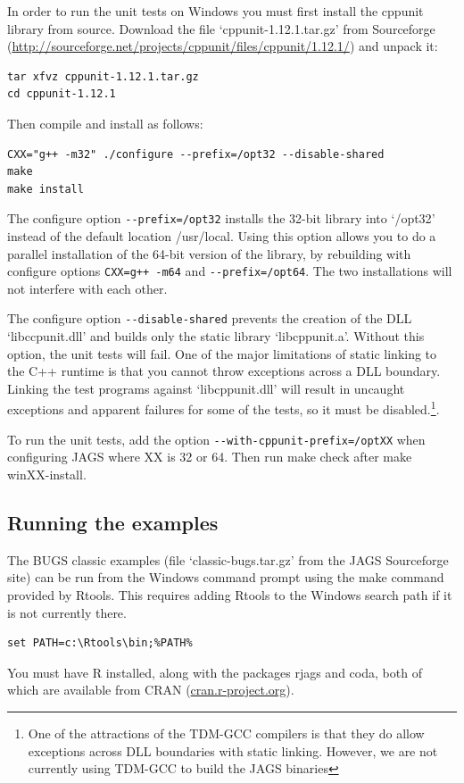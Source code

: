 \documentclass[11pt, a4paper, titlepage]{article}
\newcommand{\code}[1]{{\bgroup{\normalfont\ttfamily #1}\egroup}}
\newcommand{\file}[1]{{`\normalfont\textsf{#1}'}}
\let\command=\code
\begin{document}
In order to run the unit tests on Windows you must first install the
cppunit library from source. Download the file \file{cppunit-1.12.1.tar.gz}
from Sourceforge (\url{http://sourceforge.net/projects/cppunit/files/cppunit/1.12.1/}) and
unpack it:
\begin{verbatim}
tar xfvz cppunit-1.12.1.tar.gz
cd cppunit-1.12.1
\end{verbatim}
Then compile and install as follows:
\begin{verbatim}
CXX="g++ -m32" ./configure --prefix=/opt32 --disable-shared
make
make install
\end{verbatim}
The configure option \verb+--prefix=/opt32+ installs the 32-bit
library into \file{/opt32} instead of the default location
{/usr/local}. Using this option allows you to do a parallel
installation of the 64-bit version of the library, by rebuilding with
configure options \verb|CXX=g++ -m64| and \verb+--prefix=/opt64+. The two
installations will not interfere with each other.

The configure option \verb+--disable-shared+ prevents the creation of
the DLL \file{libccpunit.dll} and builds only the static library
\file{libcppunit.a}. Without this option, the unit tests will fail.
One of the major limitations of static linking to the C++ runtime is
that you cannot throw exceptions across a DLL boundary.  Linking the
test programs against \file{libcppunit.dll} will result in uncaught
exceptions and apparent failures for some of the tests, so it must be
disabled.\footnote{One of the attractions of the TDM-GCC compilers is
  that they do allow exceptions across DLL boundaries with static
  linking. However, we are not currently using TDM-GCC to build the
  JAGS binaries}.

To run the unit tests, add the option
\verb+--with-cppunit-prefix=/optXX+ when configuring JAGS where
\code{XX} is 32 or 64. Then run \code{make check} after \code{make
  winXX-install}.

\subsection{Running the examples}

The BUGS classic examples (file \file{classic-bugs.tar.gz} from the JAGS
Sourceforge site) can be run from the Windows command prompt using
the \command{make} command provided by Rtools. This requires adding Rtools
to the Windows search path if it is not currently there.
\begin{verbatim}
set PATH=c:\Rtools\bin;%PATH%
\end{verbatim}
You must have R installed, along with the packages \code{rjags} and
\code{coda}, both of which are available from CRAN
(\url{cran.r-project.org}).
\end{document}
